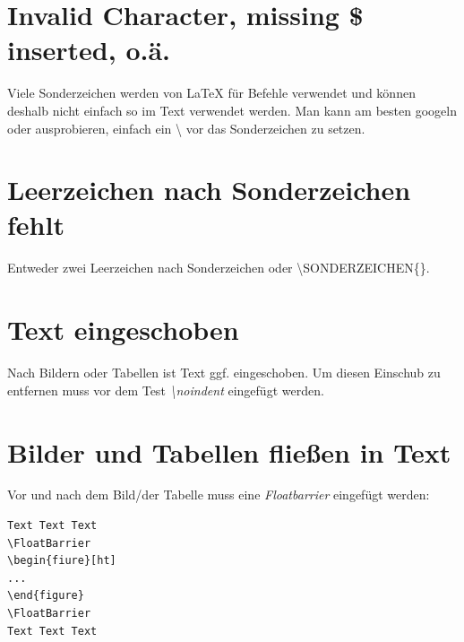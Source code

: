 \documentclass[12pt]{article}
\begin{document}
\section{Invalid Character, missing \$ inserted, o.ä.}
Viele Sonderzeichen werden von LaTeX für Befehle verwendet und können deshalb nicht einfach so im Text verwendet werden. Man kann am besten googeln oder ausprobieren, einfach ein \textbackslash{} vor das Sonderzeichen zu setzen.

\section{Leerzeichen nach Sonderzeichen fehlt}
Entweder zwei Leerzeichen nach Sonderzeichen oder \textbackslash SONDERZEICHEN\{\}.

\section{Text eingeschoben}
Nach Bildern oder Tabellen ist Text ggf. eingeschoben. Um diesen Einschub zu entfernen muss vor dem Test \textit{\textbackslash noindent} eingefügt werden.

\section{Bilder und Tabellen fließen in Text}
Vor und nach dem Bild/der Tabelle muss eine \textit{Floatbarrier} eingefügt werden:
\begin{verbatim}
Text Text Text
\FloatBarrier
\begin{fiure}[ht]
...
\end{figure}
\FloatBarrier
Text Text Text
\end{verbatim}


\clearpage
\frontmatter%
\renewcommand{\plaintitle}{Literaturverzeichnis}
\setcounter{page}{5}
\printMyBibliography
\clearpage
\renewcommand{\plaintitle}{Anhang}
{\def\makebox[#1][#2]#3{#3}%
    \listofanhang
}
\end{document}
